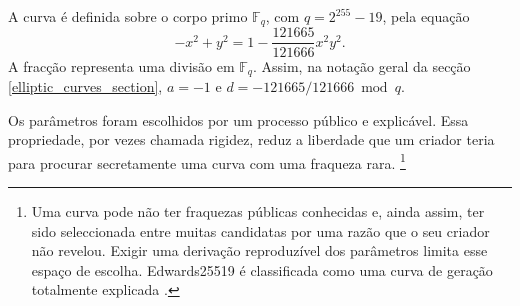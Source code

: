 %
A curva é definida sobre o corpo primo \(\mathbb{F}_q\), com
\(q=2^{255}-19\), pela equação
\[
-x^2+y^2=1-\frac{121665}{121666}x^2y^2.
\]
A fracção representa uma divisão em \(\mathbb{F}_q\). Assim, na notação geral
da secção \ref{elliptic_curves_section}, \(a=-1\) e
\(d=-121665/121666\bmod q\).

Os parâmetros foram escolhidos por um processo público e explicável. Essa
propriedade, por vezes chamada rigidez, reduz a liberdade que um criador teria
para procurar secretamente uma curva com uma fraqueza rara.
\footnote{Uma curva pode não ter fraquezas públicas conhecidas e, ainda assim,
ter sido seleccionada entre muitas candidatas por uma razão que o seu criador
não revelou. Exigir uma derivação reproduzível dos parâmetros limita esse
espaço de escolha. Edwards25519 é classificada como uma curva de geração
totalmente explicada \cite{elliptic-curve-rigidity}.}

